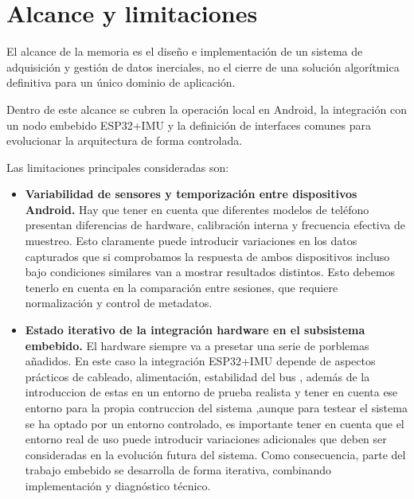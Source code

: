 \section{Alcance y limitaciones}

El alcance de la memoria es el diseño e implementación de un sistema de adquisición y gestión de datos inerciales, no el cierre de una solución algorítmica definitiva para un único dominio de aplicación.

Dentro de este alcance se cubren la operación local en Android, la integración con un nodo embebido ESP32+IMU y la definición de interfaces comunes para evolucionar la arquitectura de forma controlada.

Las limitaciones principales consideradas son:

\begin{itemize}
  \item \textbf{Variabilidad de sensores y temporización entre dispositivos Android.}
  Hay que tener en cuenta que diferentes modelos de teléfono presentan diferencias de hardware, calibración interna y frecuencia efectiva de muestreo.
  Esto claramente puede introducir variaciones en los datos capturados que si comprobamos la respuesta de ambos dispositivos incluso bajo condiciones similares van a mostrar resultados distintos. Esto debemos tenerlo en cuenta en la comparación entre sesiones, que requiere normalización y control de metadatos.

  \item \textbf{Estado iterativo de la integración hardware en el subsistema embebido.}
  El hardware siempre va a presetar una serie de porblemas añadidos. En este caso la integración ESP32+IMU depende de aspectos prácticos de cableado, alimentación, estabilidad del bus , además de la introduccion de estas en un entorno de prueba realista y tener en cuenta ese entorno para la propia contruccion del sistema ,aunque para testear el sistema se ha optado por un entorno controlado, es importante tener en cuenta que el entorno real de uso puede introducir variaciones adicionales que deben ser consideradas en la evolución futura del sistema.
  Como consecuencia, parte del trabajo embebido se desarrolla de forma iterativa, combinando implementación y diagnóstico técnico.



\end{itemize}
